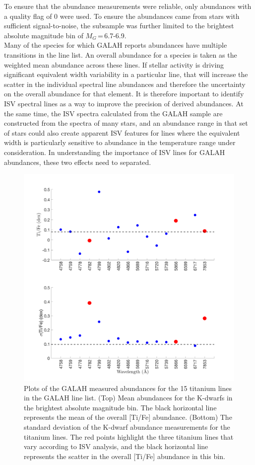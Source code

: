 To ensure that the abundance measurements were reliable, only abundances with a quality flag of 0 were used. To ensure the abundances came from stars with sufficient signal-to-noise, the subsample was further limited to the brightest absolute magnitude bin of $M_G$\,=\,6.7-6.9.\\

Many of the species for which GALAH reports abundances have multiple transitions in the line list. An overall abundance for a species is taken as the weighted mean abundance across these lines. If stellar activity is driving significant equivalent width variability in a particular line, that will increase the scatter in the individual spectral line abundances and therefore the uncertainty on the overall abundance for that element. It is therefore important to identify ISV spectral lines as a way to improve the precision of derived abundances. At the same time, the ISV spectra calculated from the GALAH sample are constructed from the spectra of many stars, and an abundance range in that set of stars could also create apparent ISV features for lines where the equivalent width is particularly sensitive to abundance in the temperature range under consideration. In understanding the importance of ISV lines for GALAH abundances, these two effects need to separated.\\

\begin{figure}
    \centering
    \includegraphics[width=.8\textwidth]{GALAH_Ti_abundance.png}
    \caption{Plots of the GALAH measured abundances for the 15 titanium lines in the GALAH line list. (Top) Mean abundances for the K-dwarfs in the brightest absolute magnitude bin. The black horizontal line represents the mean of the overall [Ti/Fe] abundance. (Bottom) The standard deviation of the K-dwarf abundance measurements for the titanium lines. The red points highlight the three titanium lines that vary according to ISV analysis, and the black horizontal line represents the scatter in the overall [Ti/Fe] abundance in this bin.}
    \label{figGALAHabundance_ti}
\end{figure}

